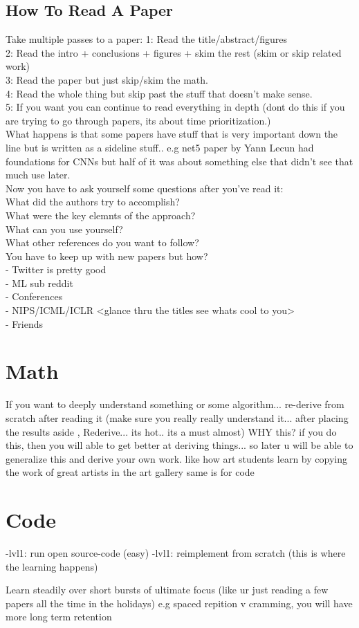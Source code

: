 \documentclass{article}
\begin{document}
\subsection{How To Read A Paper}
Take multiple passes to a paper:
1: Read the title/abstract/figures\\
2: Read the intro + conclusions + figures + skim the rest (skim or skip related work)\\
3: Read the paper but just skip/skim the math.\\
4: Read the whole thing but skip past the stuff that doesn't make sense.\\
5: If you want you can continue to read everything in depth (dont do this if you are trying to go through papers, its about time prioritization.)\\
What happens is that some papers have stuff that is very important down the line but is written as a sideline stuff.. e.g net5 paper by
Yann Lecun had foundations for CNNs but half of it was about something else that didn't see that much use later.\\
Now you have to ask yourself some questions after you've read it:\\
What did the authors try to accomplish?\\
What were the key elemnts of the approach?\\
What can you use yourself?\\
What other references do you want to follow?\\
You have to keep up with new papers but how?\\
- Twitter is pretty good\\
- ML sub reddit\\
- Conferences\\
- NIPS/ICML/ICLR <glance thru the titles see whats cool to you> \\
- Friends \\

\section{Math}
If you want to deeply understand something or some algorithm... re-derive from scratch after reading it (make sure you really really understand it... after 
placing the results aside , Rederive... its hot.. its a must almost)
WHY this? if you do this, then you will able to get better at deriving things... so later u will be able to generalize this and derive your own work. 
like how art students learn by copying the work of great artists in the art gallery
same is for code

\section{Code}
-lvl1: run open source-code (easy)
-lvl1: reimplement from scratch (this is where the learning happens)

Learn steadily over short bursts of ultimate focus  (like ur just reading a few papers all the time in the holidays)
e.g spaced repition v cramming, you will have more long term retention
\end{document}
